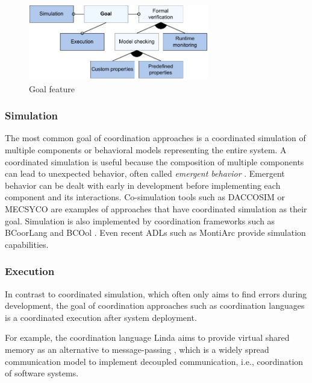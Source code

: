 \documentclass[runningheads]{llncs}
\begin{document}
\begin{figure}[ht]
	\centering
	\includegraphics[width=0.7\textwidth]{images/goal_feature}
	\caption{Goal feature}
	\label{fig:goalFeature}
\end{figure}

\subsubsection{Simulation} The most common goal of coordination approaches is a coordinated simulation of multiple components or behavioral models representing the entire system.
A coordinated simulation is useful because the composition of multiple components can lead to unexpected behavior, often called \textit{emergent behavior} \cite{ekerTamingHeterogeneityPtolemy2003}.
Emergent behavior can be dealt with early in development before implementing each component and its interactions.
Co-simulation tools such as DACCOSIM \cite{galtierFMIBasedDistributedMultisimulation2015} or MECSYCO \cite{camusCosimulationCyberphysicalSystems2018} are examples of approaches that have coordinated simulation as their goal.
Simulation is also implemented by coordination frameworks such as BCoorLang \cite{krauterBehavioralConsistencyMultimodeling2023} and BCOol \cite{varalarsenBehavioralCoordinationOperator2015}.
Even recent ADLs such as MontiArc \cite{haberMontiArcArchitecturalModeling2014} provide simulation capabilities.

\subsubsection{Execution} In contrast to coordinated simulation, which often only aims to find errors during development, the goal of coordination approaches such as coordination languages is a coordinated execution after system deployment.

For example, the coordination language Linda aims to provide virtual shared memory as an alternative to message-passing \cite{carrieroLindaAlternativeMessagepassing1994}, which is a widely spread communication model to implement decoupled communication, i.e., coordination of software systems.
\end{document}
